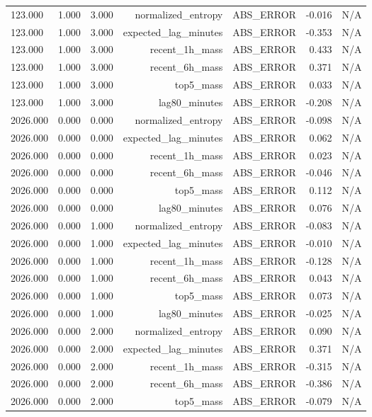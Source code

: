 \begin{table}[h!]
\begin{tabular}{lrrrrrr}
123.000 & 1.000 & 3.000 & normalized\_entropy & ABS\_ERROR & -0.016 & N/A \\
123.000 & 1.000 & 3.000 & expected\_lag\_minutes & ABS\_ERROR & -0.353 & N/A \\
123.000 & 1.000 & 3.000 & recent\_1h\_mass & ABS\_ERROR & 0.433 & N/A \\
123.000 & 1.000 & 3.000 & recent\_6h\_mass & ABS\_ERROR & 0.371 & N/A \\
123.000 & 1.000 & 3.000 & top5\_mass & ABS\_ERROR & 0.033 & N/A \\
123.000 & 1.000 & 3.000 & lag80\_minutes & ABS\_ERROR & -0.208 & N/A \\
2026.000 & 0.000 & 0.000 & normalized\_entropy & ABS\_ERROR & -0.098 & N/A \\
2026.000 & 0.000 & 0.000 & expected\_lag\_minutes & ABS\_ERROR & 0.062 & N/A \\
2026.000 & 0.000 & 0.000 & recent\_1h\_mass & ABS\_ERROR & 0.023 & N/A \\
2026.000 & 0.000 & 0.000 & recent\_6h\_mass & ABS\_ERROR & -0.046 & N/A \\
2026.000 & 0.000 & 0.000 & top5\_mass & ABS\_ERROR & 0.112 & N/A \\
2026.000 & 0.000 & 0.000 & lag80\_minutes & ABS\_ERROR & 0.076 & N/A \\
2026.000 & 0.000 & 1.000 & normalized\_entropy & ABS\_ERROR & -0.083 & N/A \\
2026.000 & 0.000 & 1.000 & expected\_lag\_minutes & ABS\_ERROR & -0.010 & N/A \\
2026.000 & 0.000 & 1.000 & recent\_1h\_mass & ABS\_ERROR & -0.128 & N/A \\
2026.000 & 0.000 & 1.000 & recent\_6h\_mass & ABS\_ERROR & 0.043 & N/A \\
2026.000 & 0.000 & 1.000 & top5\_mass & ABS\_ERROR & 0.073 & N/A \\
2026.000 & 0.000 & 1.000 & lag80\_minutes & ABS\_ERROR & -0.025 & N/A \\
2026.000 & 0.000 & 2.000 & normalized\_entropy & ABS\_ERROR & 0.090 & N/A \\
2026.000 & 0.000 & 2.000 & expected\_lag\_minutes & ABS\_ERROR & 0.371 & N/A \\
2026.000 & 0.000 & 2.000 & recent\_1h\_mass & ABS\_ERROR & -0.315 & N/A \\
2026.000 & 0.000 & 2.000 & recent\_6h\_mass & ABS\_ERROR & -0.386 & N/A \\
2026.000 & 0.000 & 2.000 & top5\_mass & ABS\_ERROR & -0.079 & N/A \\

\end{tabular}
\end{table}
